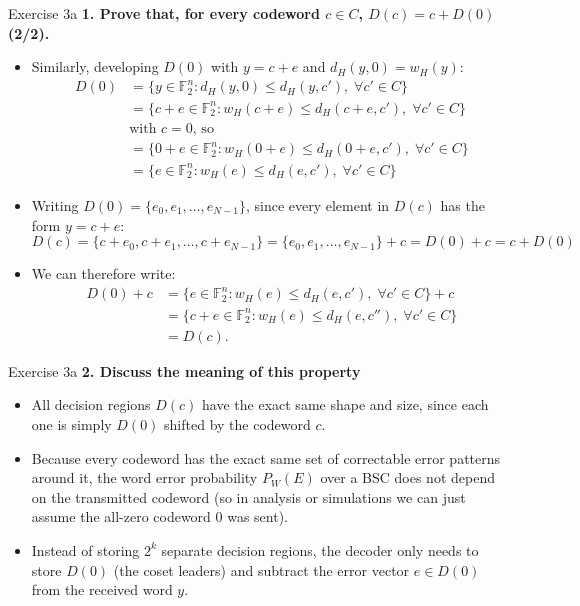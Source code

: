\documentclass[10pt, aspectratio=169]{beamer}
\newcommand{\question}[1]{{\color{QuestionRed}\textbf{#1}}}
\begin{document}
\begin{frame}{Exercise 3a}
  \question{1. Prove that, for every codeword $c \in C$, $D(c) = c + D(0)$ (2/2).}

  \vspace{0.08cm}
  \begin{itemize}
    \item Similarly, developing $D(0)$ with $y = c + e$ and $d_H(y, 0) = w_H(y)$:
    \[
      \begin{aligned}
        D(0) &= \{ y \in \mathbb{F}_2^n : d_H(y, 0) \le d_H(y, c'), \; \forall c' \in C \} \\
             &= \{ c + e \in \mathbb{F}_2^n : w_H(c + e) \le d_H(c + e, c'), \; \forall c' \in C \} \\
             &\text{with } c = 0\text{, so} \\
             &= \{ 0 + e \in \mathbb{F}_2^n : w_H(0 + e) \le d_H(0 + e, c'), \; \forall c' \in C \} \\
             &= \{ e \in \mathbb{F}_2^n : w_H(e) \le d_H(e, c'), \; \forall c' \in C \}
      \end{aligned}
    \]
    \item Writing $D(0) = \{e_0, e_1, \dots, e_{N-1}\}$, since every element in $D(c)$ has the form $y = c + e$:
    \[
      D(c) = \{ c + e_0, c + e_1, \dots, c + e_{N-1} \} = \{ e_0, e_1, \dots, e_{N-1} \} + c = D(0) + c = c + D(0)
    \]
     \item We can therefore write:
     \[
     \begin{aligned}
     	D(0) + c
     	&= \{ e \in \mathbb{F}_2^n : w_H(e) \le d_H(e, c'), \; \forall c' \in C \} + c \\
     	&= \{ c + e \in \mathbb{F}_2^n : w_H(e) \le d_H(e, c''), \; \forall c' \in C \} \\
     	&= D(c).
     \end{aligned}
     \]
  \end{itemize}
\end{frame}

\begin{frame}{Exercise 3a}
  \question{2. Discuss the meaning of this property}

  \vspace{0.25cm}
  \begin{itemize}
    \item All decision regions $D(c)$ have the exact same shape and size, since each one is simply $D(0)$ shifted by the codeword $c$.
    \item Because every codeword has the exact same set of correctable error patterns around it, the word error probability $P_W(E)$ over a BSC does not depend on the transmitted codeword (so in analysis or simulations we can just assume the all-zero codeword $0$ was sent).
    \item Instead of storing $2^k$ separate decision regions, the decoder only needs to store $D(0)$ (the coset leaders) and subtract the error vector $e \in D(0)$ from the received word $y$.
  \end{itemize}
\end{frame}
\end{document}
